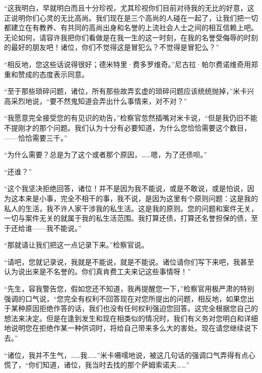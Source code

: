 \par “这我明白，早就明白而且十分珍视，尤其珍视你们目前对待我的无比的好意，这正说明你们心灵的无比高尚。我们现在是三个高尚的人碰在一起了，让我们把一切都建立在有教养、有共同的高尚出身和名誉的上流社会人士之间的相互信赖上吧。无论如何，请容许我把你们看做是在我一生的这一时刻，在我的名誉受侮辱的时刻的最好的朋友吧！诸位，你们不觉得这是冒犯么？不觉得是冒犯么？”
\par “相反地，您这些话说得很好；德米特里·费多罗维奇。”尼古拉·帕尔费诺维奇用郑重和赞成的态度表示同意。
\par “至于那些琐碎问题，诸位，所有那些故弄玄虚的琐碎问题应该统统抛掉，”米卡兴高采烈地说，“要不然鬼知道会弄出什么事情来，对不对？”
\par “我愿意完全接受您的有见识的劝告，”检察官忽然插嘴对米卡说，“但是我仍旧不能不提刚才的那个问题。我们认为十分有必要知道，为什么您恰恰需要这个数目，——恰恰需要三千。”
\par “为什么需要？总是为了这个或者那个原因，……嗯，为了还债呗。”
\par “还谁？”
\par “这个我坚决拒绝回答，诸位！并不是因为我不能说，或是不敢说，或是怕说，因为这本来是小事，完全不相干的事，我不说，是因为这里有个原则问题：这是我的私人的生活，我不许人家干涉我的私生活。这是我的原则。您的问题和案件无关，一切与案件无关的就属于我的私生活范围。我打算还债，打算还名誉担保的债，至于还给谁——我不能说。”
\par “那就请让我们把这一点记录下来。”检察官说。
\par “请吧，您就记录说，我就是不能说，就是不能说。诸位请你们写下来吧，我甚至认为说出来是不名誉的。你们真肯费工夫来记这些事情呀！”
\par “先生，容我警告您，假如您还不知道，我再提醒您一下，”检察官用极严肃的特别强调的口气说，“您完全有权利不回答现在对您所提出的问题，相反地，如果您出于某种原因拒绝作答的话，我们也没有任何权利强迫您回答。这完全根据您自己的想法来决定。但是在逢到发生和现在相类似的情况时，我们有义务对您明白和详细地说明您在拒绝作某一种供词时，将给自己带来多么大的害处。现在请您继续说下去。”
\par “诸位，我并不生气，……我……”米卡嗫嚅地说，被这几句话的强调口气弄得有点心慌了，“你们知道，诸位，我当时去找的那个萨姆索诺夫……”
